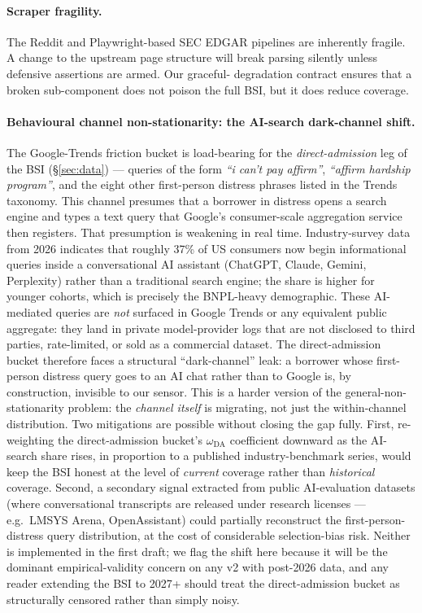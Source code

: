 \documentclass[11pt,letterpaper]{article}
\begin{document}
\paragraph{Scraper fragility.}
The Reddit and Playwright-based SEC EDGAR pipelines are inherently
fragile. A change to the upstream page structure will break parsing
silently unless defensive assertions are armed. Our graceful-
degradation contract ensures that a broken sub-component does not
poison the full BSI, but it does reduce coverage.

\paragraph{Behavioural channel non-stationarity: the AI-search
dark-channel shift.}
The Google-Trends friction bucket is load-bearing for the
\emph{direct-admission} leg of the BSI
(\S\ref{sec:data}) --- queries of the form \emph{``i can't pay
affirm''}, \emph{``affirm hardship program''}, and the eight other
first-person distress phrases listed in the Trends taxonomy. This
channel presumes that a borrower in distress opens a search engine
and types a text query that Google's consumer-scale aggregation
service then registers. That presumption is weakening in real time.
Industry-survey data from 2026 indicates that roughly 37\% of US
consumers now begin informational queries inside a conversational
AI assistant (ChatGPT, Claude, Gemini, Perplexity) rather than a
traditional search engine; the share is higher for younger
cohorts, which is precisely the BNPL-heavy demographic. These
AI-mediated queries are \emph{not} surfaced in Google Trends or
any equivalent public aggregate: they land in private model-provider
logs that are not disclosed to third parties, rate-limited, or
sold as a commercial dataset. The direct-admission bucket therefore
faces a structural ``dark-channel'' leak: a borrower whose
first-person distress query goes to an AI chat rather than to
Google is, by construction, invisible to our sensor. This is a
harder version of the general-non-stationarity problem: the
\emph{channel itself} is migrating, not just the within-channel
distribution. Two mitigations are possible without closing the
gap fully. First, re-weighting the direct-admission bucket's
$\omega_{\text{DA}}$ coefficient downward as the AI-search share
rises, in proportion to a published industry-benchmark series,
would keep the BSI honest at the level of \emph{current} coverage
rather than \emph{historical} coverage. Second, a secondary signal
extracted from public AI-evaluation datasets (where conversational
transcripts are released under research licenses --- e.g.\ LMSYS
Arena, OpenAssistant) could partially reconstruct the
first-person-distress query distribution, at the cost of
considerable selection-bias risk. Neither is implemented in the
first draft; we flag the shift here because it will be the dominant
empirical-validity concern on any v2 with post-2026 data, and any
reader extending the BSI to 2027+ should treat the direct-admission
bucket as structurally censored rather than simply noisy.
\end{document}
